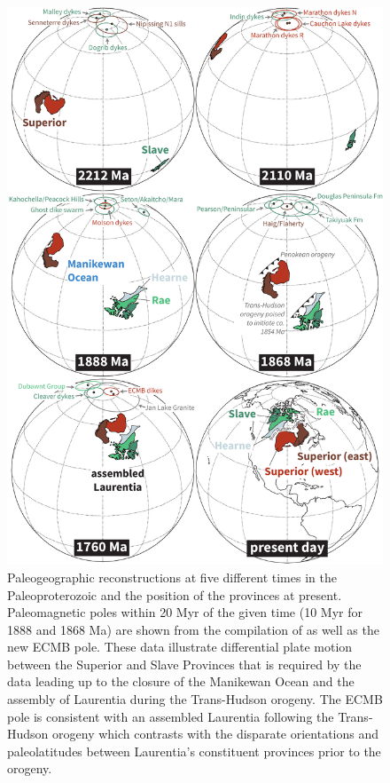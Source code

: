 \documentclass[draft]{agujournal2019}
\begin{document}
\begin{figure}[!ht]
\begin{centering}
\noindent\includegraphics[width=4.65 in]{./figures/paleogeo_reconstruction.pdf}
\caption{\small{Paleogeographic reconstructions at five different times in the Paleoproterozoic and the position of the provinces at present. Paleomagnetic poles within 20 Myr of the given time (10 Myr for 1888 and 1868 Ma) are shown from the compilation of  as well as the new ECMB pole. These data illustrate differential plate motion between the Superior and Slave Provinces that is required by the data leading up to the closure of the Manikewan Ocean and the assembly of Laurentia during the Trans-Hudson orogeny. The ECMB pole is consistent with an assembled Laurentia following the Trans-Hudson orogeny which contrasts with the disparate orientations and paleolatitudes between Laurentia's constituent provinces prior to the orogeny.}}
\label{fig:Superior_Slave_recons}
\end{centering}
\end{figure}
\end{document}
